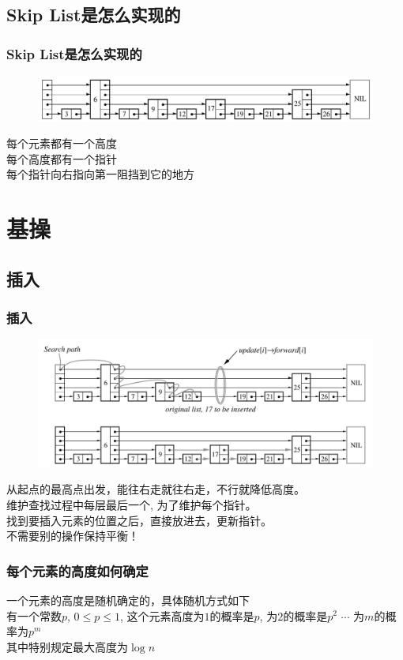 \documentclass{beamer}
\begin{document}
	\subsection{Skip List是怎么实现的}
	\begin{frame}
		\frametitle{Skip List是怎么实现的}
		\begin{figure}[H]
			\centering
			\includegraphics[scale=0.25]{./img/what_skip_list_is.jpg}
		\end{figure}
		每个元素都有一个高度\\
		每个高度都有一个指针\\
		每个指针向右指向第一阻挡到它的地方\\
	\end{frame}

	\section{基操}
	
	\subsection{插入}
	\begin{frame}
		\frametitle{插入}
		\begin{figure}[H]
			\includegraphics[scale=0.22]{./img/find.jpg}
		\end{figure}
		从起点的最高点出发，能往右走就往右走，不行就降低高度。\\
		维护查找过程中每层最后一个, 为了维护每个指针。\\
		找到要插入元素的位置之后，直接放进去，更新指针。\\
		不需要别的操作保持平衡！
	\end{frame}

	\begin{frame}
		\frametitle{每个元素的高度如何确定}
		一个元素的高度是随机确定的，具体随机方式如下\\
		有一个常数$p$, $0 \leq p \leq 1$, 这个元素高度为$1$的概率是$p$, 为$2$的概率是$p^2$ $\cdots$ 为$m$的概率为$p^m$ \\
		其中特别规定最大高度为$\log{n}$
	\end{frame}
\end{document}
